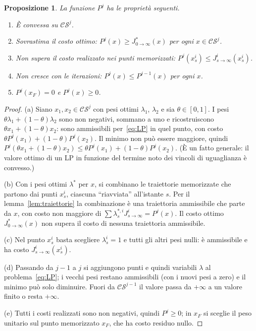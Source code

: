\documentclass[11pt,a4paper]{article}
\theoremstyle{definition}
\theoremstyle{plain}
\newtheorem{proposizione}[definizione]{Proposizione}
\theoremstyle{remark}
\newcommand{\CS}{\mathcal{CS}}
\newcommand{\Jstar}{J^{*}_{0\to\infty}}
\begin{document}
\begin{proposizione}\label{prop:P}
La funzione $P^j$ ha le proprietà seguenti.
\begin{enumerate}
  \item[(a)] \emph{È convessa} su $\CS^j$.
  \item[(b)] \emph{Sovrastima il costo ottimo}: $P^j(x)\ge\Jstar(x)$ per ogni
        $x\in\CS^j$.
  \item[(c)] \emph{Non supera il costo realizzato} nei punti memorizzati:
        $P^j(x^i_s)\le J^i_{s\to\infty}(x^i_s)$.
  \item[(d)] \emph{Non cresce con le iterazioni}: $P^{j}(x)\le P^{j-1}(x)$
        per ogni $x$.
  \item[(e)] $P^j(x_F)=0$ e $P^j(x)\ge 0$.
\end{enumerate}
\end{proposizione}
\begin{proof}
(a) Siano $x_1,x_2\in\CS^j$ con pesi ottimi $\lambda_1$, $\lambda_2$ e sia
$\theta\in[0,1]$. I pesi $\theta\lambda_1+(1-\theta)\lambda_2$ sono non
negativi, sommano a uno e ricostruiscono $\theta x_1+(1-\theta)x_2$: sono
ammissibili per~\eqref{eq:LP} in quel punto, con costo
$\theta P^j(x_1)+(1-\theta)P^j(x_2)$. Il minimo non può essere maggiore, quindi
$P^j(\theta x_1+(1-\theta)x_2)\le\theta P^j(x_1)+(1-\theta)P^j(x_2)$. (È un
fatto generale: il valore ottimo di un LP in funzione del termine noto dei
vincoli di uguaglianza è convesso.)

(b) Con i pesi ottimi $\lambda^*$ per $x$, si combinano le traiettorie
memorizzate che partono dai punti $x^i_s$, ciascuna ``riavviata''
all'istante $s$. Per il lemma~\ref{lem:traiettorie} la combinazione è una
traiettoria ammissibile che parte da $x$, con costo non maggiore di
$\sum\lambda^{*,i}_s J^i_{s\to\infty}=P^j(x)$. Il costo ottimo $\Jstar(x)$ non
supera il costo di nessuna traiettoria ammissibile.

(c) Nel punto $x^i_s$ basta scegliere $\lambda^i_s=1$ e tutti gli altri pesi
nulli: è ammissibile e ha costo $J^i_{s\to\infty}(x^i_s)$.

(d) Passando da $j-1$ a $j$ si aggiungono punti e quindi variabili $\lambda$
al problema~\eqref{eq:LP}; i vecchi pesi restano ammissibili (con i nuovi
pesi a zero) e il minimo può solo diminuire. Fuori da $\CS^{j-1}$ il valore
passa da $+\infty$ a un valore finito o resta $+\infty$.

(e) Tutti i costi realizzati sono non negativi, quindi $P^j\ge 0$; in $x_F$
si sceglie il peso unitario sul punto memorizzato $x_F$, che ha costo
residuo nullo.
\end{proof}
\end{document}

